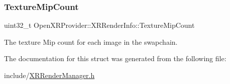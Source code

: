 \mbox{\label{struct_open_x_r_provider_1_1_x_r_render_info_ad86a33b90d0f38aa11a3cd4e0dc521b4}} 
\subsubsection{\texorpdfstring{TextureMipCount}{TextureMipCount}}
{\footnotesize\ttfamily uint32\+\_\+t Open\+X\+R\+Provider\+::\+X\+R\+Render\+Info\+::\+Texture\+Mip\+Count}



The texture Mip count for each image in the swapchain. 



The documentation for this struct was generated from the following file\+:\begin{DoxyCompactItemize}
\item 
include/\mbox{\hyperlink{_x_r_render_manager_8h}{X\+R\+Render\+Manager.\+h}}\end{DoxyCompactItemize}
